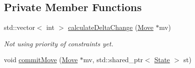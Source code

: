 \subsection*{Private Member Functions}
\begin{DoxyCompactItemize}
\item 
std\-::vector$<$ int $>$ \hyperlink{class_neighborhood_explorer_abfd048806a7d347a426627b501cbd064}{calculate\-Delta\-Change} (\hyperlink{class_move}{Move} $\ast$mv)
\begin{DoxyCompactList}\small\item\em Not using priority of constraints yet. \end{DoxyCompactList}\item 
void \hyperlink{class_neighborhood_explorer_ab2746ffea7415f67c086f467a94bb361}{commit\-Move} (\hyperlink{class_move}{Move} $\ast$mv, std\-::shared\-\_\-ptr$<$ \hyperlink{class_state}{State} $>$ st)
\end{DoxyCompactItemize}



